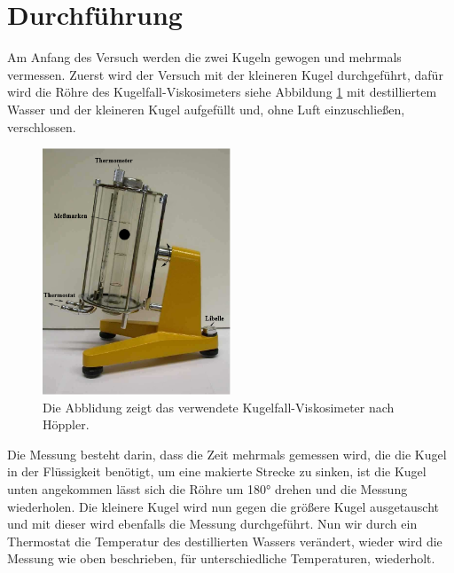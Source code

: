 \newpage
\section{Durchführung}
\label{sec:Durchführung}
Am Anfang des Versuch werden die zwei Kugeln gewogen
und mehrmals vermessen. Zuerst wird der Versuch mit
der kleineren Kugel durchgeführt, dafür wird die
Röhre des Kugelfall-Viskosimeters siehe Abbildung \ref{abb:visko} mit destilliertem Wasser und der kleineren Kugel
aufgefüllt und, ohne Luft einzuschließen, verschlossen.
\begin{figure}
 \centering
 \includegraphics[width=0.5\textwidth]{bild.PNG}
\caption{Die Abblidung zeigt das verwendete Kugelfall-Viskosimeter nach Höppler.\cite{sample}}
\label{abb:visko}
\end{figure}
Die Messung besteht darin, dass die Zeit mehrmals
gemessen wird, die die Kugel in der Flüssigkeit benötigt,
um eine makierte Strecke zu sinken, ist die Kugel unten angekommen
lässt sich die Röhre um 180° drehen und die Messung wiederholen.
Die kleinere Kugel wird nun gegen die größere Kugel
ausgetauscht und mit dieser wird ebenfalls die Messung
durchgeführt. Nun wir durch ein Thermostat
die Temperatur des destillierten Wassers verändert,
wieder wird die Messung wie oben beschrieben,
für unterschiedliche
Temperaturen, wiederholt.
